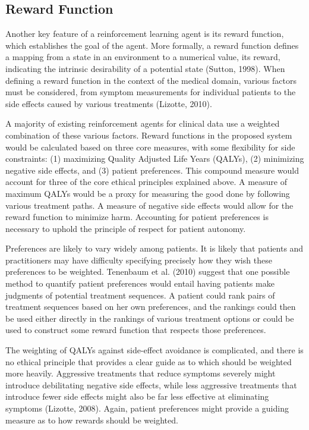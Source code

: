 \documentclass[]{spie}  %
\begin{document}

\subsection{Reward Function}
\label{sec:reward}

Another key feature of a reinforcement learning agent is its reward function, which establishes the goal of the agent. More formally, a reward function defines a mapping from a state in an environment to a numerical value, its reward, indicating the intrinsic desirability of a potential state (Sutton, 1998). When defining a reward function in the context of the medical domain, various factors must be considered, from symptom measurements for individual patients to the side effects caused by various treatments (Lizotte, 2010).

A majority of existing reinforcement agents for clinical data use a weighted combination of these various factors. Reward functions in the proposed system would be calculated based on three core measures, with some flexibility for side constraints: (1) maximizing Quality Adjusted Life Years (QALYs), (2) minimizing negative side effects, and (3) patient preferences. This compound measure would account for three of the core ethical principles explained above. A measure of maximum QALYs would be a proxy for measuring the good done by following various treatment paths. A measure of negative side effects would allow for the reward function to minimize harm. Accounting for patient preferences is necessary to uphold the principle of respect for patient autonomy.

Preferences are likely to vary widely among patients. It is likely that patients and practitioners may have difficulty specifying precisely how they wish these preferences to be weighted. Tenenbaum et al. (2010) suggest that one possible method to quantify patient preferences would entail having patients make judgments of potential treatment sequences. A patient could rank pairs of treatment sequences based on her own preferences, and the rankings could then be used either directly in the rankings of various treatment options or could be used to construct some reward function that respects those preferences.

The weighting of QALYs against side-effect avoidance is complicated, and there is no ethical principle that provides a clear guide as to which should be weighted more heavily. Aggressive treatments that reduce symptoms severely might introduce debilitating negative side effects, while less aggressive treatments that introduce fewer side effects might also be far less effective at eliminating symptoms (Lizotte, 2008). Again, patient preferences might provide a guiding measure as to how rewards should be weighted.
\end{document}
